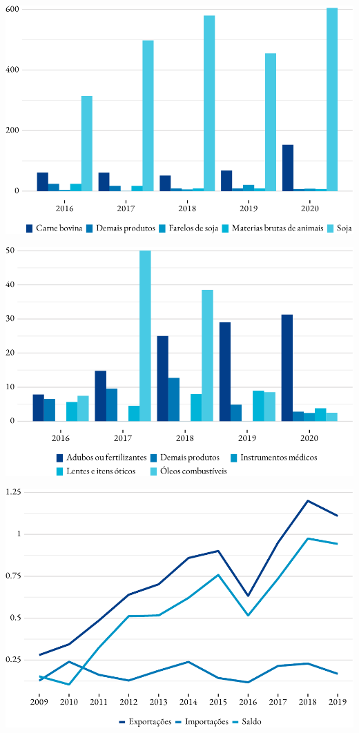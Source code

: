 \includegraphics{fig/produtos_expo-1.pdf}

\includegraphics{fig/produtos_import-1.pdf}

\includegraphics{fig/total-1.pdf}
